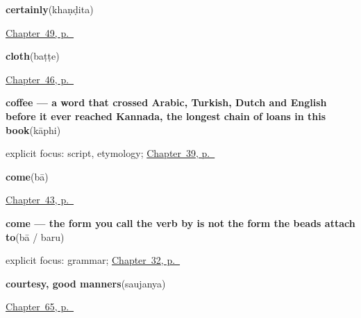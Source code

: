 \noindent\begin{minipage}[t]{\linewidth}
\raggedright
\textbf{certainly}\enspace\emph{}\enspace(khaṇḍita)\par
\footnotesize \hyperref[ch:ka-replies]{Chapter~49, p.~\pageref*{ch:ka-replies}}
\end{minipage}\par\smallskip

\noindent\begin{minipage}[t]{\linewidth}
\raggedright
\textbf{cloth}\enspace\emph{}\enspace(baṭṭe)\par
\footnotesize \hyperref[ch:ka-ask-for]{Chapter~46, p.~\pageref*{ch:ka-ask-for}}
\end{minipage}\par\smallskip

\noindent\begin{minipage}[t]{\linewidth}
\raggedright
\textbf{coffee — a word that crossed Arabic, Turkish, Dutch and English before it ever reached Kannada, the longest chain of loans in this book}\enspace\emph{}\enspace(kāphi)\par
\footnotesize explicit focus: script, etymology; \hyperref[ch:ka-tea-coffee-milk]{Chapter~39, p.~\pageref*{ch:ka-tea-coffee-milk}}
\end{minipage}\par\smallskip

\noindent\begin{minipage}[t]{\linewidth}
\raggedright
\textbf{come}\enspace\emph{}\enspace(bā)\par
\footnotesize \hyperref[ch:ka-more-verbs]{Chapter~43, p.~\pageref*{ch:ka-more-verbs}}
\end{minipage}\par\smallskip

\noindent\begin{minipage}[t]{\linewidth}
\raggedright
\textbf{come — the form you call the verb by is not the form the beads attach to}\enspace\emph{}\enspace(bā / baru)\par
\footnotesize explicit focus: grammar; \hyperref[ch:ka-core-verbs]{Chapter~32, p.~\pageref*{ch:ka-core-verbs}}
\end{minipage}\par\smallskip

\noindent\begin{minipage}[t]{\linewidth}
\raggedright
\textbf{courtesy, good manners}\enspace\emph{}\enspace(saujanya)\par
\footnotesize \hyperref[ch:ka-manners]{Chapter~65, p.~\pageref*{ch:ka-manners}}
\end{minipage}\par\smallskip

